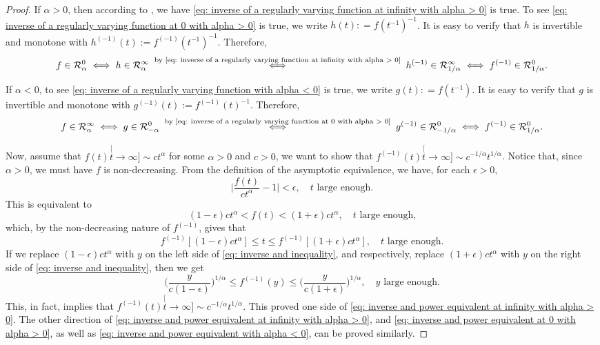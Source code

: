 \documentclass[12pt, a4paper]{amsart}
\theoremstyle{definition}
\numberwithin{equation}{section}
\begin{document}
\begin{proof}
	If $\alpha>0$, then according to \cite[Theorem 1.5.12.]{BinghamGoldieTeugels1989Regular}, we have \eqref{eq: inverse of a regularly varying function at infinity with alpha > 0} is true.
	To see 	\eqref{eq: inverse of a regularly varying function at 0 with alpha > 0} is true, we write $h(t) : = f(t^{-1})^{-1}$.
	It is  easy to verify that 
	$h$ is invertible and monotone 
	with $h^{(-1)}(t) := f^{(-1)}(t^{-1})^{-1}$.
	Therefore,
\[
	f
	\in \mathcal R^0_{\alpha}
	\iff h
	\in \mathcal R^\infty_{\alpha}
	\stackrel{  \text{ by \eqref{eq: inverse of a regularly varying function at infinity with alpha > 0} }   }{\iff} h^{(-1)}
	\in \mathcal R^\infty_{1/\alpha}
	\iff f^{(-1)}
	\in \mathcal R^0_{1/\alpha}.
\]

	If $\alpha < 0$, to see	\eqref{eq: inverse of a regularly varying function with alpha < 0} is true, we write $g(t) : = f(t^{-1})$.
	It is easy to verify that 
	$g$ is invertible and monotone with $g^{(-1)}(t) := f^{(-1)}(t)^{-1}$.
	Therefore,
\[
	f
	\in \mathcal R^\infty_{\alpha}
	\iff g
	\in \mathcal R^0_{-\alpha}
	\stackrel{  \text{ by \eqref{eq: inverse of a regularly varying function at 0 with alpha > 0} }   }{\iff} g^{(-1)}
	\in \mathcal R^0_{-1/\alpha}
	\iff f^{(-1)}
	\in \mathcal R^0_{1/\alpha}.
\]
	
	Now, assume that
	$f(t) \stackrel[t\to \infty]{}{\sim} c t^\alpha$ for some $\alpha > 0$ and $c > 0$, we want to show that $f^{(-1)}(t) \stackrel[t\to \infty]{}{\sim} c^{-1/\alpha} t^{1/\alpha}$.
	Notice that, since $\alpha >0$, we must have $f$ is non-decreasing.
	From the definition of the asymptotic equivalence, we have, for each $\epsilon> 0$,
\[
	\Big|\frac{f(t)}{c t^\alpha} - 1\Big|
	< \epsilon,
	\quad t \text{ large enough.}
\]
	This is equivalent to
\[
	(1-\epsilon) c t^{\alpha}
	< f(t)
	< (1+ \epsilon)c t^{\alpha},
	\quad t \text{ large enough,}
\]
	which, by the non-decreasing nature of $f^{(-1)}$, gives that
\[\label{eq: inverse and inequality}
	f^{(-1)}[(1-\epsilon) c t^{\alpha}] \leq t \leq f^{(-1)}[(1+ \epsilon)c t^{\alpha}], \quad t \text{ large enough.}
\]
	If we replace $(1-\epsilon) c t^{\alpha}$ with $y$ on the left side of \eqref{eq: inverse and inequality}, and respectively, replace $(1+\epsilon) c t^{\alpha}$ with $y$ on the right side of \eqref{eq: inverse and inequality}, then we get
\[
	\Big(\frac{y}{c(1-\epsilon)}\Big)^{1/\alpha}
	\leq f^{(-1)}(y) \leq \Big(\frac{y}{c(1+\epsilon)}\Big)^{1/\alpha},
	\quad y \text{ large enough.}
\]
	This, in fact, implies that $ f^{(-1)}(t) \stackrel[t\to \infty]{}{\sim} c^{-1/\alpha} t^{1/\alpha}. $
	This proved one side of \eqref{eq: inverse and power equivalent at infinity with alpha > 0}.
	The other direction of \eqref{eq: inverse and power equivalent at infinity with alpha > 0}, and \eqref{eq: inverse and power equivalent at 0 with alpha > 0}, as well as \eqref{eq: inverse and power equivalent with alpha < 0}, can be proved similarly.
\end{proof}
\end{document}
